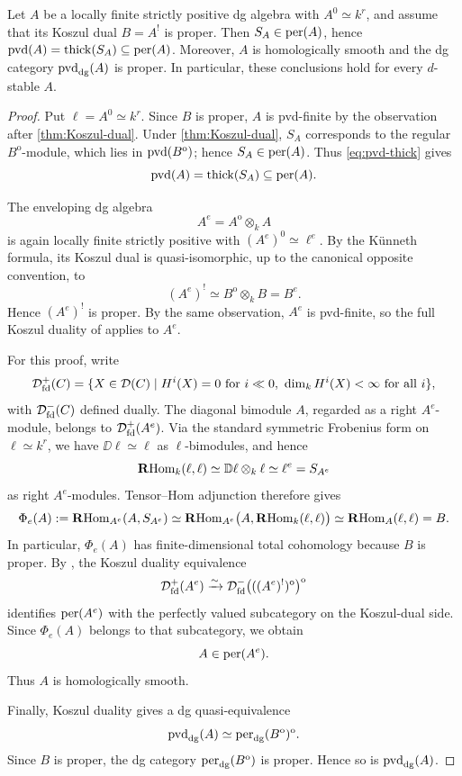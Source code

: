 \documentclass[11pt,a4paper,dvipsnames,x11names]{amsart}
\begin{document}
\begin{prop}\label{prop:smooth-proper}
Let $A$ be a locally finite strictly positive dg algebra with $A^0\simeq k^r$, and assume that its Koszul dual $B=A^!$ is proper. Then $S_A\in\operatorname{per}(A)$, hence $\operatorname{pvd}(A)=\operatorname{thick}(S_A)\subseteq\operatorname{per}(A)$. Moreover, $A$ is homologically smooth and the dg category $\operatorname{pvd}_{\mathrm{dg}}(A)$ is proper. In particular, these conclusions hold for every $d$-stable $A$.
\end{prop}
\begin{proof}
Put $\ell=A^0\simeq k^r$. Since $B$ is proper, $A$ is pvd-finite by the observation after \cref{thm:Koszul-dual}. Under \cref{thm:Koszul-dual}, $S_A$ corresponds to the regular $B^{\mathrm{o}}$-module, which lies in $\operatorname{pvd}(B^{\mathrm{o}})$; hence $S_A\in\operatorname{per}(A)$. Thus \eqref{eq:pvd-thick} gives
\[
\operatorname{pvd}(A)=\operatorname{thick}(S_A)\subseteq\operatorname{per}(A).
\]

The enveloping dg algebra
\[
A^e=A^{\mathrm{o}}\otimes_k A
\]
is again locally finite strictly positive with $(A^e)^0\simeq\ell^e$. By the K\"unneth formula, its Koszul dual is quasi-isomorphic, up to the canonical opposite convention, to
\[
(A^e)^!\simeq B^{\mathrm{o}}\otimes_k B=B^e.
\]
Hence $(A^e)^!$ is proper. By the same observation, $A^e$ is pvd-finite, so the full Koszul duality of \cite[Theorem~D(2)]{Fus24} applies to $A^e$.

For this proof, write
\[
\mathcal D^+_{\mathrm{fd}}(C)=\{X\in\mathcal D(C)\mid H^i(X)=0\text{ for }i\ll0,\ \dim_kH^i(X)<\infty\text{ for all }i\},
\]
with $\mathcal D^-_{\mathrm{fd}}(C)$ defined dually. The diagonal bimodule $A$, regarded as a right $A^e$-module, belongs to $\mathcal D^+_{\mathrm{fd}}(A^e)$. Via the standard symmetric Frobenius form on $\ell\simeq k^r$, we have $\DD\ell\simeq \ell$ as $\ell$-bimodules, and hence
\[
\operatorname{\mathbf{R}Hom}_k(\ell,\ell)\simeq \mathbb D\ell\otimes_k\ell\simeq \ell^e=S_{A^e}
\]
as right $A^e$-modules. Tensor--Hom adjunction therefore gives
\[
\Phi_e(A):=\operatorname{\mathbf{R}Hom}_{A^e}(A,S_{A^e})
\simeq
\operatorname{\mathbf{R}Hom}_{A^e}\bigl(A,\operatorname{\mathbf{R}Hom}_k(\ell,\ell)\bigr)
\simeq
\operatorname{\mathbf{R}Hom}_A(\ell,\ell)
=
B.
\]
In particular, $\Phi_e(A)$ has finite-dimensional total cohomology because $B$ is proper. By \cite[Theorem~D(2)]{Fus24}, the Koszul duality equivalence
\[
\mathcal D^+_{\mathrm{fd}}(A^e)\xrightarrow{\sim}
\mathcal D^-_{\mathrm{fd}}\bigl(((A^e)^!)^{\mathrm{o}}\bigr)^{\mathrm{o}}
\]
identifies $\operatorname{per}(A^e)$ with the perfectly valued subcategory on the Koszul-dual side. Since $\Phi_e(A)$ belongs to that subcategory, we obtain
\[
A\in\operatorname{per}(A^e).
\]
Thus $A$ is homologically smooth.

Finally, Koszul duality gives a dg quasi-equivalence
\[
\operatorname{pvd}_{\mathrm{dg}}(A)\simeq \operatorname{per}_{\mathrm{dg}}(B^{\mathrm{o}})^{\mathrm{o}}.
\]
Since $B$ is proper, the dg category $\operatorname{per}_{\mathrm{dg}}(B^{\mathrm{o}})$ is proper. Hence so is $\operatorname{pvd}_{\mathrm{dg}}(A)$.
\end{proof}
\end{document}
